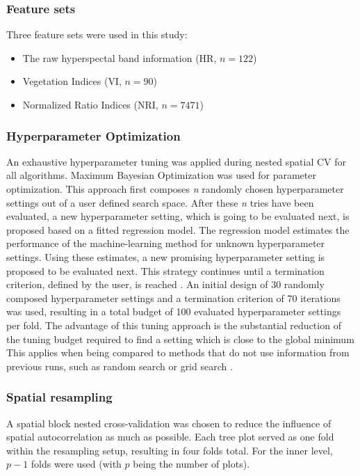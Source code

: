 \documentclass[review]{elsarticle}
\begin{document}
\subsubsection{Feature sets}

Three feature sets were used in this study:

\begin{itemize}
	\item The raw hyperspectal band information (HR, $n = 122$)
	\item Vegetation Indices (\ac{VI}, $n = 90$)
	\item Normalized Ratio Indices (\ac{NRI}, $n = 7471$)
\end{itemize}


\subsubsection{Hyperparameter Optimization}

An exhaustive hyperparameter tuning was applied during nested spatial \ac{CV} for all algorithms.
Maximum Bayesian Optimization \citep{mlrmbo} was used for parameter optimization.
This approach first composes \textit{n} randomly chosen hyperparameter settings out of a user defined search space.
After these \textit{n} tries have been evaluated, a new hyperparameter setting, which is going to be evaluated next, is proposed based on a fitted regression model.
The regression model estimates the performance of the machine-learning method for unknown hyperparameter settings.
Using these estimates, a new promising hyperparameter setting is proposed to be evaluated next.
This strategy continues until a termination criterion, defined by the user, is reached \citep{hutter2011, jones1998}.
An initial design of 30 randomly composed hyperparameter settings and a termination criterion of 70 iterations was used, resulting in a total budget of 100 evaluated hyperparameter settings per fold.
The advantage of this tuning approach is the substantial reduction of the tuning budget required to find a setting which is close to the global minimum
This applies when being compared to methods that do not use information from previous runs, such as random search or grid search \citep{bergstra2012}.

\subsubsection{Spatial resampling}

A spatial block nested cross-validation was chosen to reduce the influence of spatial autocorrelation as much as possible.
Each tree plot served as one fold within the resampling setup, resulting in four folds total.
For the inner level, $p - 1$ folds were used (with $p$ being the number of plots).
\end{document}

